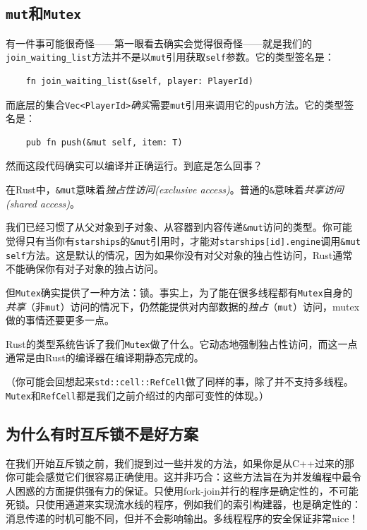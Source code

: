 \subsection{\texttt{mut}和\texttt{Mutex}}\label{MutAndMutex}
有一件事可能很奇怪——第一眼看去确实会觉得很奇怪——就是我们的\texttt{join\_waiting\_list}方法并不是以\texttt{mut}引用获取\texttt{self}参数。它的类型签名是：
\begin{verbatim}
    fn join_waiting_list(&self, player: PlayerId)
\end{verbatim}

而底层的集合\texttt{Vec<PlayerId>}\emph{确实}需要\texttt{mut}引用来调用它的\texttt{push}方法。它的类型签名是：
\begin{verbatim}
    pub fn push(&mut self, item: T)
\end{verbatim}

然而这段代码确实可以编译并正确运行。到底是怎么回事？

在Rust中，\texttt{\&mut}意味着\emph{独占性访问(exclusive access)}。普通的\texttt{\&}意味着\emph{共享访问(shared access)}。

我们已经习惯了从父对象到子对象、从容器到内容传递\texttt{\&mut}访问的类型。你可能觉得只有当你有\texttt{starships}的\texttt{\&mut}引用时，才能对\texttt{starships[id].engine}调用\texttt{\&mut self}方法。这是默认的情况，因为如果你没有对父对象的独占性访问，Rust通常不能确保你有对子对象的独占访问。

但\texttt{Mutex}确实提供了一种方法：锁。事实上，为了能在很多线程都有\texttt{Mutex}自身的\emph{共享}（非\texttt{mut}）访问的情况下，仍然能提供对内部数据的\emph{独占}（\texttt{mut}）访问，mutex做的事情还要更多一点。

Rust的类型系统告诉了我们\texttt{Mutex}做了什么。它动态地强制独占性访问，而这一点通常是由Rust的编译器在编译期静态完成的。

（你可能会回想起来\texttt{std::cell::RefCell}做了同样的事，除了并不支持多线程。\texttt{Mutex}和\texttt{RefCell}都是我们之前介绍过的内部可变性的体现。）

\subsection{为什么有时互斥锁不是好方案}
在我们开始互斥锁之前，我们提到过一些并发的方法，如果你是从C++过来的那你可能会感觉它们很容易正确使用。这并非巧合：这些方法旨在为并发编程中最令人困惑的方面提供强有力的保证。只使用fork-join并行的程序是确定性的，不可能死锁。只使用通道来实现流水线的程序，例如我们的索引构建器，也是确定性的：消息传递的时机可能不同，但并不会影响输出。多线程程序的安全保证非常nice！

